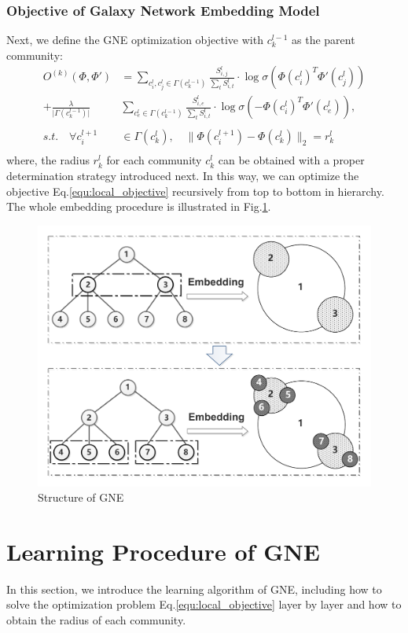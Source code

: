 \documentclass{article}
\theoremstyle{definition}
\begin{document}
	\subsubsection{Objective of Galaxy Network Embedding Model}
	Next, we define the GNE optimization objective with $c_k^{l-1}$ as the parent community:
	\begin{equation}
	  \label{equ:local_objective}
	  \begin{split}
	  O^{(k)}(\Phi, \Phi') & = \sum_{c_i^l, c_j^l \in \Gamma(c_k^{l-1})} \frac{S_{i,j}^l}{\sum_t S_{i, t}^l} \cdot \log{\sigma(\Phi(c_i^l)^T \Phi'(c_j^l))} \\
		 + \frac{\lambda}{\lvert\Gamma(c_k^{l-1})\rvert}&\sum_{c_e^l \in \Gamma(c_k^{l-1})} \frac{S_{i, e}^l}{\sum_t S_{i, t}^l} \cdot \log{\sigma(-\Phi(c_i^l)^T \Phi'(c_e^l))}, \\
		 \\
		s.t. \quad \forall c_i^{l+1} & \in \Gamma(c_k^l),\quad \lVert \Phi(c_i^{l+1})  - \Phi(c_k^l)\rVert_2= r_k^l \\
	  \end{split}
	  \end{equation}
	where, the radius $r_k^l$ for each community $c_k^l$ can be obtained with a proper determination strategy introduced next. In this way, we can optimize the objective Eq.\ref{equ:local_objective} recursively from top to bottom in hierarchy. The whole embedding procedure is illustrated in Fig.\ref{fig:structure}. 

	\begin{figure}[ht]
	 	\centering
		\includegraphics[width=0.6\linewidth]{figure/Structure.pdf}
		\caption{Structure of GNE}
		\label{fig:structure}
	 \end{figure}

	 \section{Learning Procedure of GNE}
	 In this section, we introduce the learning algorithm of GNE, including how to solve the optimization problem Eq.\ref{equ:local_objective} layer by layer and how to obtain the radius of each community.
\end{document}
